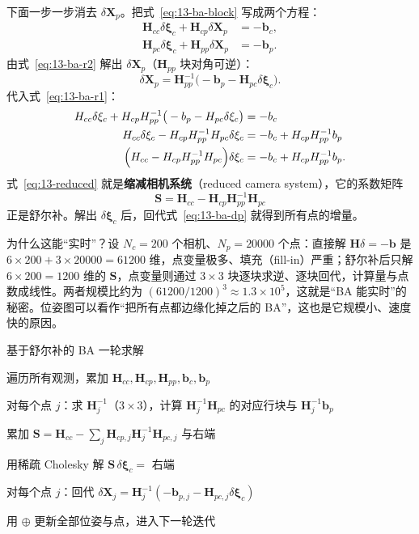 下面一步一步消去 $\delta\bm{X}_p$。把式~\eqref{eq:13-ba-block} 写成两个方程：
\begin{align}
\bm{H}_{cc}\delta\bm{\xi}_c+\bm{H}_{cp}\delta\bm{X}_p&=-\bm{b}_c, \label{eq:13-ba-r1}\\
\bm{H}_{pc}\delta\bm{\xi}_c+\bm{H}_{pp}\delta\bm{X}_p&=-\bm{b}_p. \label{eq:13-ba-r2}
\end{align}
由式~\eqref{eq:13-ba-r2} 解出 $\delta\bm{X}_p$（$\bm{H}_{pp}$ 块对角可逆）：
\begin{equation}
\delta\bm{X}_p=\bm{H}_{pp}^{-1}\big(-\bm{b}_p-\bm{H}_{pc}\delta\bm{\xi}_c\big).
\label{eq:13-ba-dp}
\end{equation}
代入式~\eqref{eq:13-ba-r1}：
\begin{align}
H_{cc}\delta\xi_c+H_{cp}H_{pp}^{-1}\big(-b_p-H_{pc}\delta\xi_c\big)&=-b_c\notag\\
H_{cc}\delta\xi_c-H_{cp}H_{pp}^{-1}H_{pc}\delta\xi_c&=-b_c+H_{cp}H_{pp}^{-1}b_p\notag\\
\Big(H_{cc}-H_{cp}H_{pp}^{-1}H_{pc}\Big)\delta\xi_c&=-b_c+H_{cp}H_{pp}^{-1}b_p .
\label{eq:13-reduced}
\end{align}
式~\eqref{eq:13-reduced} 就是\textbf{缩减相机系统}（reduced camera system），它的系数矩阵
\begin{equation}
\bm{S}=\bm{H}_{cc}-\bm{H}_{cp}\bm{H}_{pp}^{-1}\bm{H}_{pc}
\label{eq:13-schur}
\end{equation}
正是舒尔补。解出 $\delta\bm{\xi}_c$ 后，回代式~\eqref{eq:13-ba-dp} 就得到所有点的增量。

为什么这能``实时''？设 $N_c=200$ 个相机、$N_p=20000$ 个点：直接解 $\bm{H}\delta=-\bm{b}$ 是 $6\times200+3\times20000=61200$ 维，点变量极多、填充（fill-in）严重；舒尔补后只解 $6\times200=1200$ 维的 $\bm{S}$，点变量则通过 $3\times3$ 块逐块求逆、逐块回代，计算量与点数成线性。两者规模比约为 $(61200/1200)^{3}\approx1.3\times10^{5}$，这就是``BA 能实时''的秘密。位姿图可以看作``把所有点都边缘化掉之后的 BA''，这也是它规模小、速度快的原因。

\begin{pseudo}{基于舒尔补的 BA 一轮求解}
  \item 遍历所有观测，累加 $\bm{H}_{cc},\bm{H}_{cp},\bm{H}_{pp},\bm{b}_c,\bm{b}_p$
  \item 对每个点 $j$：求 $\bm{H}_j^{-1}$（$3\times3$），计算 $\bm{H}_j^{-1}\bm{H}_{pc}$ 的对应行块与 $\bm{H}_j^{-1}\bm{b}_p$
  \item 累加 $\bm{S}=\bm{H}_{cc}-\sum_j\bm{H}_{cp,j}\bm{H}_j^{-1}\bm{H}_{pc,j}$ 与右端
  \item 用稀疏 Cholesky 解 $\bm{S}\,\delta\bm{\xi}_c=$ 右端
  \item 对每个点 $j$：回代 $\delta\bm{X}_j=\bm{H}_j^{-1}(-\bm{b}_{p,j}-\bm{H}_{pc,j}\delta\bm{\xi}_c)$
  \item 用 $\oplus$ 更新全部位姿与点，进入下一轮迭代
\end{pseudo}

